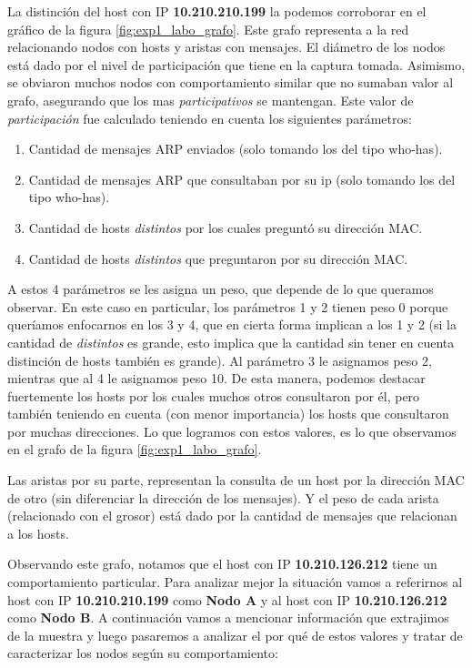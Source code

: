 \par La distinción del host con IP \textbf{10.210.210.199} la podemos corroborar en el gráfico de la figura \ref{fig:exp1_labo_grafo}. Este grafo representa a la red relacionando nodos con hosts y aristas con mensajes. El diámetro de los nodos está dado por el nivel de participación que tiene en la captura tomada. Asimismo, se obviaron muchos nodos con comportamiento similar que no sumaban valor al grafo, asegurando que los mas \textit{participativos} se mantengan. Este valor de \textit{participación} fue calculado teniendo en cuenta los siguientes parámetros:

\begin{enumerate}
	\item Cantidad de mensajes ARP enviados (solo tomando los del tipo who-has).
	\item Cantidad de mensajes ARP que consultaban por su ip (solo tomando los del tipo who-has).
	\item Cantidad de hosts \textit{distintos} por los cuales preguntó su dirección MAC.
	\item Cantidad de hosts \textit{distintos} que preguntaron por su dirección MAC.
\end{enumerate}

\par A estos 4 parámetros se les asigna un peso, que depende de lo que queramos observar. En este caso en particular, los parámetros 1 y 2 tienen peso 0 porque queríamos enfocarnos en los 3 y 4, que en cierta forma implican a los 1 y 2 (si la cantidad de \textit{distintos} es grande, esto implica que la cantidad sin tener en cuenta distinción de hosts también es grande). Al parámetro 3 le asignamos peso 2, mientras que al 4 le asignamos peso 10. De esta manera, podemos destacar fuertemente los hosts por los cuales muchos otros consultaron por él, pero también teniendo en cuenta (con menor importancia) los hosts que consultaron por muchas direcciones. Lo que logramos con estos valores, es lo que observamos en el grafo de la figura \ref{fig:exp1_labo_grafo}.
\par Las aristas por su parte, representan la consulta de un host por la dirección MAC de otro (sin diferenciar la dirección de los mensajes). Y el peso de cada arista (relacionado con el grosor) está dado por la cantidad de mensajes que relacionan a los hosts.
\par Observando este grafo, notamos que el host con IP \textbf{10.210.126.212} tiene un comportamiento particular. Para analizar mejor la situación vamos a referirnos al host con IP \textbf{10.210.210.199} como \textbf{Nodo A} y al host con IP \textbf{10.210.126.212} como \textbf{Nodo B}. A continuación vamos a mencionar información que extrajimos de la muestra y luego pasaremos a analizar el por qué de estos valores y tratar de caracterizar los nodos según su comportamiento:

